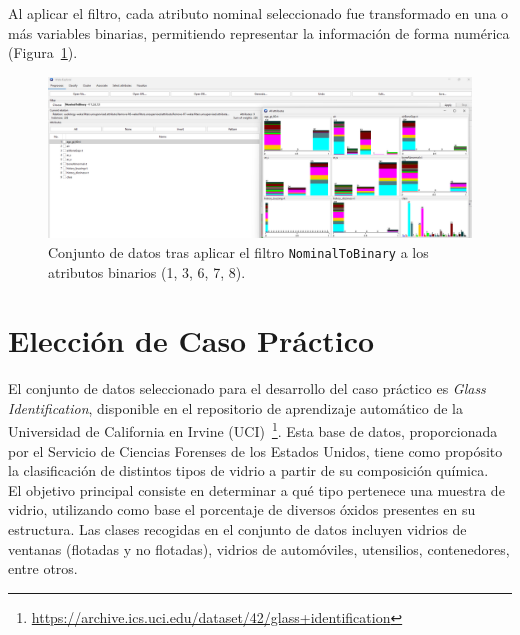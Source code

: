 \documentclass{article}
\begin{document}
Al aplicar el filtro, cada atributo nominal seleccionado fue transformado en una o más variables binarias, permitiendo representar la información de forma numérica (Figura~\ref{fig:nominal-to-binary}).

\begin{figure}[!ht]
    \centering
    \includegraphics[width=1\linewidth]{Imágenes/NominalToBinary.png}
    \caption{Conjunto de datos tras aplicar el filtro \texttt{NominalToBinary} a los atributos binarios (1, 3, 6, 7, 8).}
    \label{fig:nominal-to-binary}
\end{figure}

\newpage

\section{Elección de Caso Práctico}


El conjunto de datos seleccionado para el desarrollo del caso práctico es \textit{Glass Identification}, disponible en el repositorio de aprendizaje automático de la Universidad de California en Irvine (UCI)~\footnote{\url{https://archive.ics.uci.edu/dataset/42/glass+identification}}. Esta base de datos, proporcionada por el Servicio de Ciencias Forenses de los Estados Unidos, tiene como propósito la clasificación de distintos tipos de vidrio a partir de su composición química.\\

El objetivo principal consiste en determinar a qué tipo pertenece una muestra de vidrio, utilizando como base el porcentaje de diversos óxidos presentes en su estructura. Las clases recogidas en el conjunto de datos incluyen vidrios de ventanas (flotadas y no flotadas), vidrios de automóviles, utensilios, contenedores, entre otros.\\
\end{document}
